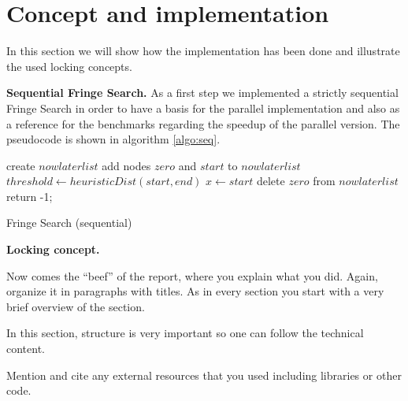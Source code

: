 \documentclass[letterpaper]{article}
\newcommand{\mypar}[1]{{\bf #1.}}
\begin{document}
\section{Concept and implementation}\label{sec:impl}

In this section we will show how the implementation has been done and illustrate  the used locking concepts.

\mypar{Sequential Fringe Search}
As a first step we implemented a strictly sequential Fringe Search in order to have a basis for the parallel implementation and also as a reference for the benchmarks regarding the speedup of the parallel version. The pseudocode is shown in algorithm \ref{algo:seq}.
\begin{algorithm}[h]
 \SetInd{0.5em}{0.5em}
 create $nowlaterlist$\;
 add nodes $zero$ and $start$ to $nowlaterlist$\;
 $threshold \leftarrow heuristicDist(start, end)$\;
 $x \leftarrow start$\;
delete $zero$ from $nowlaterlist$\;
return -1; 
\caption{Fringe Search (sequential)\label{algo:seq}}
\end{algorithm}

\mypar{Locking concept}

Now comes the ``beef'' of the report, where you explain what you
did. Again, organize it in paragraphs with titles. As in every section
you start with a very brief overview of the section.

In this section, structure is very important so one can follow the technical content.

Mention and cite any external resources that you used including libraries or other code.
\end{document}
